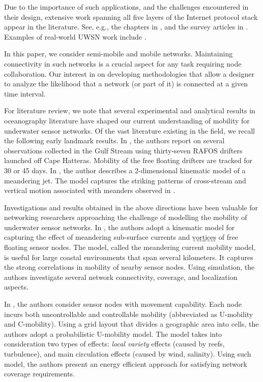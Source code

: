 Due to the importance of such applications, and the challenges encountered
in their design, extensive work spanning all five layers of the Internet
protocol stack appear in the literature.
%
See, e.g., the chapters in \cite{xiao2010underwater, otnes2012underwater},
and the survey articles in \cite{partan2007survey, climent2014underwater}.
%
Examples of real-world UWSN work include
\cite{rice2000evolution,jaffe2006sensor,roy2006wideArea,rice2007seaweb,
pu2013comparing}.

In this paper, we consider semi-mobile and mobile networks.
%
Maintaining connectivity in such networks is a crucial aspect for
any task requiring node collaboration.
%
Our interest in on developing methodologies that allow a designer
to analyze the likelihood that a network (or part of it) is connected
at a given time interval.

For literature review, we note that several experimental and analytical
results in oceanography literature have shaped our current understanding
of mobility for underwater sensor networks.
%
Of the vast literature existing in the field, we recall the following
early landmark results.
%
In \cite{bower1989evidence}, the authors report on several observations
collected in the Gulf Stream using thirty-seven RAFOS drifters launched
off Cape Hatteras. Mobility of the free floating drifters are tracked
for 30 or 45 days.
%
In \cite{bower91simple}, the author describes a 2-dimensional kinematic
model of a meandering jet. 
%
The model captures the striking patterns of cross-stream and vertical
motion associated with meanders observed in \cite{bower1989evidence}.


Investigations and results obtained in the above directions have
been valuable for networking researchers approaching the challenge
of modelling the mobility of underwater sensor networks.
%
In \cite{caruso2008meandering}, the authors adopt a kinematic model
for capturing the effect of meandering sub-surface currents and v̰o̰r̰t̰ḭc̰ḛs̰
of free floating sensor nodes.
%
The model, called the meandering current mobility model, is useful
for large coastal environments that span several kilometers.
%
It captures the strong correlations in mobility of nearby sensor nodes.
%
Using simulation, the authors investigate several network connectivity,
coverage, and localization aspects.


In \cite{luo2009double}, the authors consider sensor nodes with movement
capability.
%
Each node incurs both uncontrollable and controllable mobility
(abbreviated as U-mobility and C-mobility).
%
Using a grid layout that divides a geographic area into cells, the authors
adopt a probabilistic U-mobility model.
%
The model takes into consideration two types of effects:
{\em local variety} effects (caused by reefs, turbulence), and
{main circulation}  effects (caused by wind, salinity).
%
Using such model, the authors present an energy efficient approach for
satisfying network coverage requirements.


